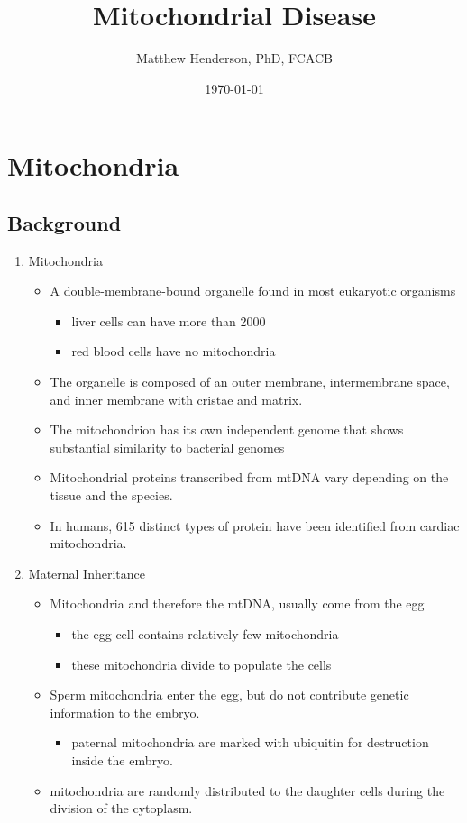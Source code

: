 \documentclass{scrartcl}
\author{Matthew Henderson, PhD, FCACB}
\date{\today}
\title{Mitochondrial Disease}
\begin{document}
\maketitle
\tableofcontents


\section{Mitochondria}
\label{sec:org379bc4c}
\subsection{Background}
\label{sec:org5664ccb}
\begin{enumerate}
\item Mitochondria
\label{sec:org2b4e51f}
\begin{itemize}
\item A double-membrane-bound organelle found in most eukaryotic organisms
\begin{itemize}
\item liver cells can have more than 2000
\item red blood cells have no mitochondria
\end{itemize}

\item The organelle is composed of an outer membrane, intermembrane
space, and inner membrane with cristae and matrix.

\item The mitochondrion has its own independent genome that shows
substantial similarity to bacterial genomes

\item Mitochondrial proteins transcribed from mtDNA vary depending on the
tissue and the species.

\item In humans, 615 distinct types of protein have been identified from
cardiac mitochondria.
\end{itemize}

\item Maternal Inheritance
\label{sec:orgb71ba96}
\begin{itemize}
\item Mitochondria and therefore the mtDNA, usually come from the egg
\begin{itemize}
\item the egg cell contains relatively few mitochondria
\item these mitochondria divide to populate the cells
\end{itemize}
\item Sperm mitochondria enter the egg, but do not contribute genetic
information to the embryo.
\begin{itemize}
\item paternal mitochondria are marked with ubiquitin for destruction
inside the embryo.
\end{itemize}
\item mitochondria are randomly distributed to the daughter cells during
the division of the cytoplasm.
\end{itemize}


\end{enumerate}
\end{document}
